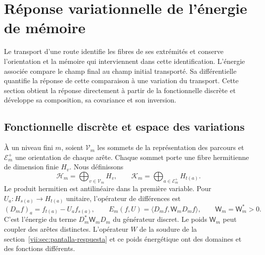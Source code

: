 
\section{Réponse variationnelle de l'énergie de mémoire}
\label{vii:sec:variacion-memoria}

Le transport d'une route identifie les fibres de ses extrémités et conserve l'orientation et la mémoire qui interviennent dans cette identification. L'énergie associée compare le champ final au champ initial transporté. Sa différentielle quantifie la réponse de cette comparaison à une variation du transport. Cette section obtient la réponse directement à partir de la fonctionnelle discrète et développe sa composition, sa covariance et son inversion.

\subsection{Fonctionnelle discrète et espace des variations}
\label{vii:subsec:funcional-memoria}

À un niveau fini \(m\), soient \(\mathcal V_m\) les sommets de la représentation des parcours et \(\mathcal E_m^+\) une orientation de chaque arête. Chaque sommet porte une fibre hermitienne de dimension finie \(H_v\). Nous définissons
\[
 \mathcal H_m=\bigoplus_{v\in\mathcal V_m}H_v,\qquad
 \mathcal K_m=\bigoplus_{a\in\mathcal E_m^+}H_{t(a)}.
\]
Le produit hermitien est antilinéaire dans la première variable.
Pour \(U_a:H_{s(a)}\to H_{t(a)}\) unitaire, l'opérateur de différences est
\begin{equation}
 (D_mf)_a=f_{t(a)}-U_af_{s(a)},\qquad
 E_m(f,U)=\langle D_mf,\mathsf W_mD_mf\rangle,\qquad
 \mathsf W_m=\mathsf W_m^*>0.
 \label{vii:eq:energia-memoria-discreta}
\end{equation}
C'est l'énergie du terme \(D_m^*\mathsf W_mD_m\) du générateur discret.
Le poids \(\mathsf W_m\) peut coupler des arêtes distinctes. L'opérateur \(W\)
de la soudure de la section~\ref{vii:sec:pantalla-respuesta} et ce poids
énergétique ont des domaines et des fonctions différents.

